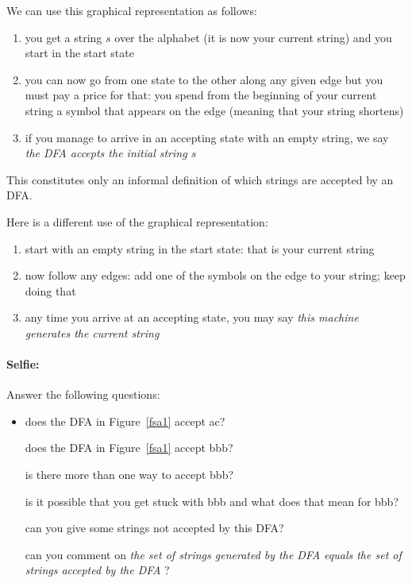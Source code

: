 We can use this graphical representation as follows:

\begin{enumerate}
\item you get a string $s$ over the alphabet (it is now your current
  string) and you start in the start state
\item you can now go from one state to the other along any given
  edge but you must pay a price for that: you spend from the beginning
  of your current string a symbol that appears on the edge (meaning
  that your string shortens)
\item if you manage to arrive in an accepting state with an empty string,
  we say {\em the DFA accepts the initial string $s$}
\end{enumerate}

This constitutes only an informal definition of which strings are
accepted by an DFA.

Here is a different use of the graphical representation:

\begin{enumerate}
\item start with an empty string in the start state: that is your
  current string
\item now follow any edges: add one of the symbols on the edge to your string; keep doing that
\item any time you arrive at an accepting state, you may say {\em this machine generates the current string}
\end{enumerate}



\paragraph{Selfie:} Answer the following questions:

\begin{itemize}
\item[]
does the DFA in Figure~\ref{fsa1} accept ac?

does the DFA in Figure~\ref{fsa1} accept bbb?

is there more than one way to accept bbb?

is it possible that you get stuck with bbb and what does that mean for bbb?

can you give some strings not accepted by this DFA?


can you comment on {\em the set of strings generated by the DFA equals
  the set of strings accepted by the DFA} ?
\end{itemize}

